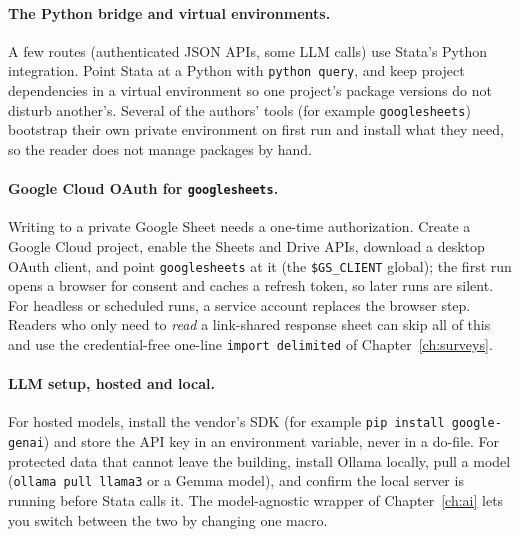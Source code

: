\documentclass[
    a4paper,
    fontsize=10pt,
    twoside=true,
    numbers=noenddot,
]{kaobook}
\begin{document}
\paragraph{The Python bridge and virtual environments.} A few routes (authenticated JSON APIs, some LLM calls) use Stata's Python integration. Point Stata at a Python with \texttt{python query}, and keep project dependencies in a virtual environment so one project's package versions do not disturb another's. Several of the authors' tools (for example \texttt{googlesheets}) bootstrap their own private environment on first run and install what they need, so the reader does not manage packages by hand.

\paragraph{Google Cloud OAuth for \texttt{googlesheets}.} Writing to a private Google Sheet needs a one-time authorization. Create a Google Cloud project, enable the Sheets and Drive APIs, download a desktop OAuth client, and point \texttt{googlesheets} at it (the \texttt{\$GS\_CLIENT} global); the first run opens a browser for consent and caches a refresh token, so later runs are silent. For headless or scheduled runs, a service account replaces the browser step. Readers who only need to \emph{read} a link-shared response sheet can skip all of this and use the credential-free one-line \texttt{import delimited} of Chapter~\ref{ch:surveys}.

\paragraph{LLM setup, hosted and local.} For hosted models, install the vendor's SDK (for example \texttt{pip install google-genai}) and store the API key in an environment variable, never in a do-file. For protected data that cannot leave the building, install Ollama locally, pull a model (\texttt{ollama pull llama3} or a Gemma model), and confirm the local server is running before Stata calls it. The model-agnostic wrapper of Chapter~\ref{ch:ai} lets you switch between the two by changing one macro.
\end{document}
